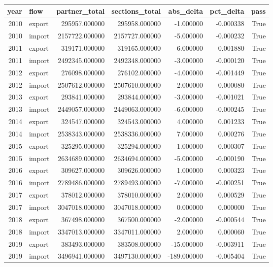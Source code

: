 \begin{tabular}{rlrrrrr}
\toprule
year & flow & partner_total & sections_total & abs_delta & pct_delta & pass \\
\midrule
2010 & export & 295957.000000 & 295958.000000 & -1.000000 & -0.000338 & True \\
2010 & import & 2157722.000000 & 2157727.000000 & -5.000000 & -0.000232 & True \\
2011 & export & 319171.000000 & 319165.000000 & 6.000000 & 0.001880 & True \\
2011 & import & 2492345.000000 & 2492348.000000 & -3.000000 & -0.000120 & True \\
2012 & export & 276098.000000 & 276102.000000 & -4.000000 & -0.001449 & True \\
2012 & import & 2507612.000000 & 2507610.000000 & 2.000000 & 0.000080 & True \\
2013 & export & 293841.000000 & 293844.000000 & -3.000000 & -0.001021 & True \\
2013 & import & 2449057.000000 & 2449063.000000 & -6.000000 & -0.000245 & True \\
2014 & export & 324547.000000 & 324543.000000 & 4.000000 & 0.001233 & True \\
2014 & import & 2538343.000000 & 2538336.000000 & 7.000000 & 0.000276 & True \\
2015 & export & 325295.000000 & 325294.000000 & 1.000000 & 0.000307 & True \\
2015 & import & 2634689.000000 & 2634694.000000 & -5.000000 & -0.000190 & True \\
2016 & export & 309627.000000 & 309626.000000 & 1.000000 & 0.000323 & True \\
2016 & import & 2789486.000000 & 2789493.000000 & -7.000000 & -0.000251 & True \\
2017 & export & 378012.000000 & 378010.000000 & 2.000000 & 0.000529 & True \\
2017 & import & 3047018.000000 & 3047018.000000 & 0.000000 & 0.000000 & True \\
2018 & export & 367498.000000 & 367500.000000 & -2.000000 & -0.000544 & True \\
2018 & import & 3347013.000000 & 3347011.000000 & 2.000000 & 0.000060 & True \\
2019 & export & 383493.000000 & 383508.000000 & -15.000000 & -0.003911 & True \\
2019 & import & 3496941.000000 & 3497130.000000 & -189.000000 & -0.005404 & True \\

\end{tabular}

